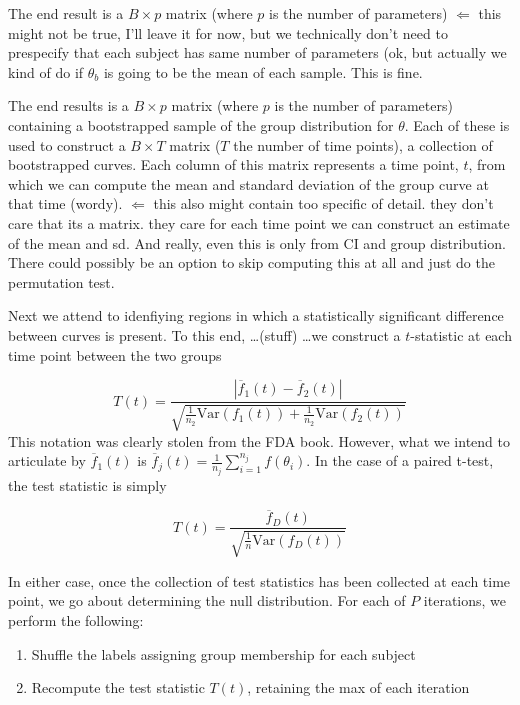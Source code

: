\documentclass{article}
\begin{document}
The end result is a $B \times p$ matrix (where $p$ is the number of parameters) $\Leftarrow$ this might not be true, I'll leave it for now, but we technically don't need to prespecify that each subject has same number of parameters (ok, but actually we kind of do if $\theta_b$ is going to be the mean of each sample. This is fine.

The end results is a $B \times p$ matrix (where $p$ is the number of parameters) containing a bootstrapped sample of the group distribution for $\theta$. Each of these is used to construct a $B \times T$ matrix ($T$ the number of time points), a collection of bootstrapped curves. Each column of this matrix represents a time point, $t$, from which we can compute the mean and standard deviation of the group curve at that time (wordy). $\Leftarrow$ this also might contain too specific of detail. they don't care that its a matrix. they care for each time point we can construct an estimate of the mean and sd. And really, even this is only from CI and group distribution. There could possibly be an option to skip computing this at all and just do the permutation test.

Next we attend to idenfiying regions in which a statistically significant difference between curves is present. To this end, \ldots (stuff) \ldots we construct a $t$-statistic at each time point between the two groups

\begin{equation}
T(t) = \frac{|\overline{f}_1(t) - \overline{f}_2(t)|}{\sqrt{\frac{1}{n_2} \text{Var}(f_1(t)) + \frac{1}{n_2} \text{Var}(f_2(t))}}
\end{equation}
This notation was clearly stolen from the FDA book. However, what we intend to articulate by $\overline{f}_1(t)$ is $\overline{f}_j(t) = \frac{1}{n_j} \sum_{i=1}^{n_j} f(\theta_i)$. In the case of a paired t-test, the test statistic is simply

\begin{equation}
T(t) = \frac{\overline{f}_D(t)}{\sqrt{\frac1n \text{Var}(f_D(t))}}
\end{equation}

In either case, once the collection of test statistics has been collected at each time point, we go about determining the null distribution. For each of $P$ iterations, we perform the following:

\begin{enumerate}
\item Shuffle the labels assigning group membership for each subject
\item Recompute the test statistic $T(t)$, retaining the max of each iteration
\end{enumerate}
\end{document}
